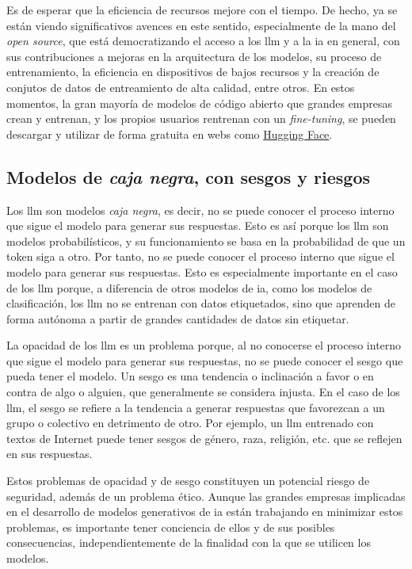 Es de esperar que la eficiencia de recursos mejore con el tiempo. De hecho, ya se están viendo significativos avences en este sentido, especialmente de la mano del \emph{open source}, que está democratizando el acceso a los \gls{llm} y a la \gls{ia} en general, con sus contribuciones a mejoras en la arquitectura de los modelos, su proceso de entrenamiento, la eficiencia en dispositivos de bajos recursos y la creación de conjutos de datos de entreamiento de alta calidad, entre otros. En estos momentos, la gran mayoría de modelos de código abierto que grandes empresas crean y entrenan, y los propios usuarios rentrenan con un \emph{fine-tuning}, se pueden descargar y utilizar de forma gratuita en webs como \href{https://huggingface.co/}{Hugging Face}.


\subsection{Modelos de \emph{caja negra}, con sesgos y riesgos}

Los \gls{llm} son modelos \emph{caja negra}, es decir, no se puede conocer el proceso interno que sigue el modelo para generar sus respuestas. Esto es así porque los \gls{llm} son modelos probabilísticos, y su funcionamiento se basa en la probabilidad de que un token siga a otro. Por tanto, no se puede conocer el proceso interno que sigue el modelo para generar sus respuestas. Esto es especialmente importante en el caso de los \gls{llm} porque, a diferencia de otros modelos de \gls{ia}, como los modelos de clasificación, los \gls{llm} no se entrenan con datos etiquetados, sino que aprenden de forma autónoma a partir de grandes cantidades de datos sin etiquetar.

La opacidad de los \gls{llm} es un problema porque, al no conocerse el proceso interno que sigue el modelo para generar sus respuestas, no se puede conocer el sesgo que pueda tener el modelo. Un sesgo es una tendencia o inclinación a favor o en contra de algo o alguien, que generalmente se considera injusta. En el caso de los \gls{llm}, el sesgo se refiere a la tendencia a generar respuestas que favorezcan a un grupo o colectivo en detrimento de otro. Por ejemplo, un \gls{llm} entrenado con textos de Internet puede tener sesgos de género, raza, religión, etc. que se reflejen en sus respuestas.

Estos problemas de opacidad y de sesgo constituyen un potencial riesgo de seguridad, además de un problema ético. Aunque las grandes empresas implicadas en el desarrollo de modelos generativos de \gls{ia} están trabajando en minimizar estos problemas, es importante tener conciencia de ellos y de sus posibles consecuencias, independientemente de la finalidad con la que se utilicen los modelos.